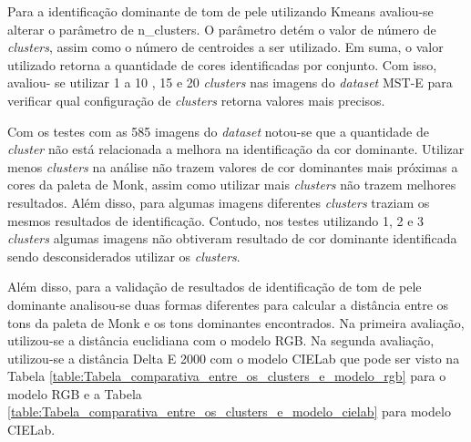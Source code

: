Para a identificação dominante de tom de pele utilizando Kmeans avaliou-se alterar o parâmetro de n\_clusters. O parâmetro detém o valor de número de \textit{clusters},  assim como o número de centroides a ser utilizado. Em suma, o valor utilizado retorna a quantidade de cores identificadas por conjunto. Com isso, avaliou- se utilizar 1 a 10 , 15 e 20 \textit{clusters} nas imagens do \textit{dataset} MST-E para verificar qual configuração de \textit{clusters} retorna valores mais precisos. 

Com os testes com as 585 imagens do \textit{dataset} notou-se que a quantidade de \textit{cluster} não está relacionada a melhora na identificação da cor dominante. Utilizar menos \textit{clusters} na análise não trazem valores de cor dominantes mais próximas a cores da paleta de Monk, assim como utilizar mais \textit{clusters} não trazem melhores resultados. Além disso, para algumas imagens diferentes \textit{clusters} traziam os mesmos resultados de identificação. Contudo, nos testes utilizando 1, 2 e 3 \textit{clusters} algumas imagens não obtiveram resultado de cor dominante identificada sendo desconsiderados utilizar os \textit{clusters}. 

Além disso, para a validação de resultados de identificação de tom de pele dominante analisou-se duas formas diferentes para calcular a distância entre os tons da paleta de Monk e os tons dominantes encontrados. Na primeira avaliação, utilizou-se a distância euclidiana com o modelo RGB. Na segunda avaliação, utilizou-se a distância Delta E 2000 com o modelo CIELab que pode ser visto na Tabela \ref{table:Tabela_comparativa_entre_os_clusters_e_modelo_rgb} para o modelo RGB e a Tabela \ref{table:Tabela_comparativa_entre_os_clusters_e_modelo_cielab} para  modelo CIELab.

